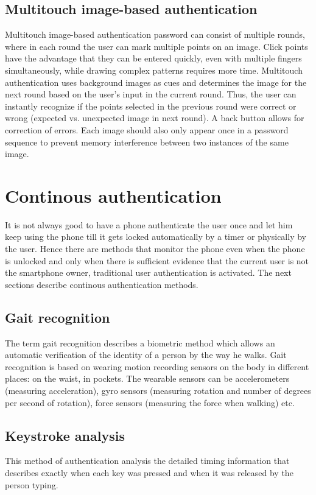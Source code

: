 \subsection{Multitouch image-based authentication}
Multitouch image-based authentication password can consist of multiple rounds, where in each round the user can mark multiple points on an image. Click points have the advantage that they can be entered quickly,  even with multiple fingers simultaneously, while drawing complex patterns requires more time. Multitouch authentication uses background images as cues and determines the image for the next round based on the user's input in the current round. Thus, the user can instantly recognize if the points selected in the previous round were correct or wrong (expected vs. unexpected image in next round). A back button allows for correction of errors. Each image should also only appear once in a password sequence to prevent memory interference between two instances of the same image. \cite{ritter2013miba}

\section{Continous authentication}
It is not always good to have a phone authenticate the user once and let him keep using the phone till it gets locked automatically by a timer or physically by the user. Hence there are methods that monitor the phone even when the phone is unlocked and only when there is sufficient evidence that the current user is not the smartphone owner, traditional user authentication is activated. The next sections describe continous authentication methods.

\subsection{Gait recognition}
The term gait recognition describes a biometric method
which allows an automatic verification of the identity of a person by the way he walks. Gait recognition is based on wearing motion recording sensors on the body in different places: on the waist, in pockets. The wearable sensors can be accelerometers (measuring acceleration), gyro sensors (measuring rotation and number of degrees per second of rotation), force sensors (measuring the force when walking) etc. \cite{derawi2010unobtrusive, srirama2012social}

\subsection{Keystroke analysis}
This method of authentication analysis the detailed timing information that describes exactly when each key was pressed and when it was released by the person typing. \cite{buchoux2008deployment}

